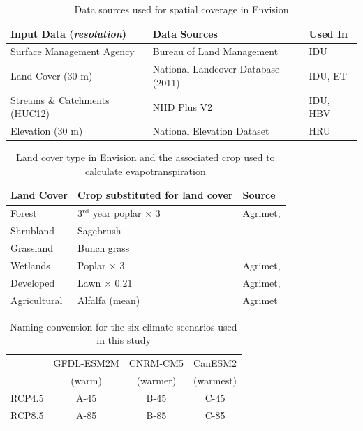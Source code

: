 \documentclass[11pt,letterpaper]{article}
\begin{document}
%
%
%
%
\begin{table}
\caption{Data sources used for spatial coverage in Envision}
\label{table:DataSources}
\centering
\begin{tabular}{l l l}
\hline\hline
Input Data (\textit{resolution}) & Data Sources & Used In\\
\hline
Surface Management Agency & Bureau of Land Management & IDU \\
Land Cover (30 m) & National Landcover Database (2011) & IDU, ET \\
Streams \& Catchments (HUC12) & NHD Plus V2 & IDU, HBV \\
Elevation (30 m) & National Elevation Dataset & HRU \\
\hline\hline
\end{tabular}
\end{table}
\clearpage

\begin{table}
\caption{Land cover type in Envision and the associated crop used to calculate evapotranspiration}
\label{table:LandCoverType}
\centering
\begin{tabular}{l l l}
\hline\hline
Land Cover & Crop substituted for land cover & Source \\
\hline
Forest & 3${}^{\mathrm{rd}}$ year poplar $\times$ 3 & Agrimet, \citet{Inouye:2014ws} \\
Shrubland & Sagebrush & \citet{Allen:2007ta} \\
Grassland & Bunch grass & \citet{Allen:2007ta} \\
Wetlands & Poplar $\times$ 3 & Agrimet, \citet{Inouye:2014ws} \\
Developed & Lawn $\times$ 0.21 & Agrimet, \citet{Inouye:2014ws} \\
Agricultural & Alfalfa (mean) & Agrimet \\
\hline\hline
\end{tabular}
\end{table}
\clearpage

\begin{table}
\caption{Naming convention for the six climate scenarios used in this study}
\label{table:ExperimentDesign}
\centering
\begin{tabular}{c c c c}
\hline\hline
 & GFDL-ESM2M & CNRM-CM5 & CanESM2 \\
 & (warm) & (warmer) & (warmest) \\
\hline
RCP4.5 & A-45 & B-45 & C-45 \\
RCP8.5 & A-85 & B-85 & C-85 \\
\hline
\hline
\end{tabular}
\end{table}
\clearpage
\end{document}
